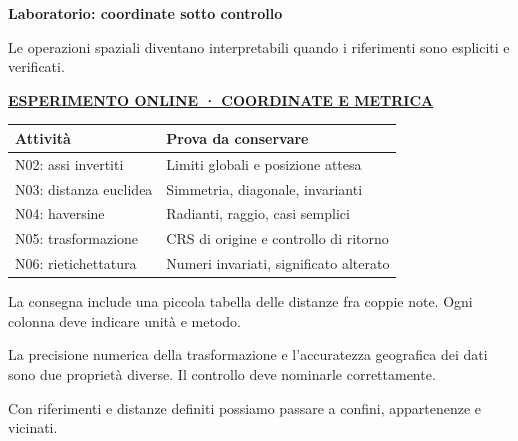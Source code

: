 \documentclass[12pt,aspectratio=1610]{beamer}
\newcommand{\PBody}[1]{\par{\fontsize{11.3}{14.8}\selectfont #1\par}}
\newcommand{\PSmall}[1]{\par{\fontsize{9.8}{13.1}\selectfont #1\par}}
\newcommand{\PInfo}[1]{%
\begin{tcolorbox}[enhanced,arc=1.6mm,boxrule=.55pt,colback=GeoTint,
 colframe=Rule!80!Classical,left=2.3mm,right=2.3mm,top=2mm,bottom=2mm,
 before skip=1mm,after skip=1mm]
\PSmall{#1}\end{tcolorbox}}
\newcommand{\PLab}[2]{\par{\color{Classical}\bfseries\fontsize{9}{11}\selectfont
\href{#1}{\MakeUppercase{#2}}}\par\vspace{1.8mm}}
\begin{document}
\begin{frame}[plain]\hypertarget{slide31}{}
\begin{lrbox}{\TitleBox}
\begin{minipage}[t]{17.7cm}\raggedright\color{Ink}\fontsize{11.3}{14.8}\selectfont
\color{Navy}\bfseries\fontsize{20.6}{24.5}\selectfont Laboratorio: coordinate sotto controllo
\end{minipage}\end{lrbox}

\begin{lrbox}{\RecallBox}
\begin{minipage}[t]{14.3cm}\raggedright\color{Ink}\fontsize{11.3}{14.8}\selectfont
\fontsize{10.3}{13.8}\selectfont Le operazioni spaziali diventano interpretabili quando i riferimenti sono espliciti e verificati.
\end{minipage}\end{lrbox}

\begin{lrbox}{\PilotLeftBox}
\begin{minipage}[t]{10.05cm}\raggedright\color{Ink}\fontsize{11.3}{14.8}\selectfont
\PLab{https://marzione00.github.io/Lab_Geo/\#laboratorio/m11-coordinate}{Esperimento online · coordinate e metrica}
{\fontsize{10.2}{13.1}\selectfont\renewcommand{\arraystretch}{1.45}\begin{tabular}{@{}p{4.1cm}p{4.9cm}@{}}\toprule
\textbf{Attività} & \textbf{Prova da conservare}\\\midrule
N02: assi invertiti & Limiti globali e posizione attesa\\
N03: distanza euclidea & Simmetria, diagonale, invarianti\\
N04: haversine & Radianti, raggio, casi semplici\\
N05: trasformazione & CRS di origine e controllo di ritorno\\
N06: rietichettatura & Numeri invariati, significato alterato\\
\bottomrule\end{tabular}}

\end{minipage}\end{lrbox}

\begin{lrbox}{\PilotRightBox}
\begin{minipage}[t]{7.55cm}\raggedright\color{Ink}\fontsize{11.3}{14.8}\selectfont
\PBody{La consegna include una piccola tabella delle distanze fra coppie note. Ogni colonna deve indicare unità e metodo.}
\vspace{2.5mm}
\PInfo{La precisione numerica della trasformazione e l’accuratezza geografica dei dati sono due proprietà diverse. Il controllo deve nominarle correttamente.}
\PBody{Con riferimenti e distanze definiti possiamo passare a confini, appartenenze e vicinati.}
\vspace{2.5mm}


\end{minipage}
\end{lrbox}
\end{frame}
\end{document}
